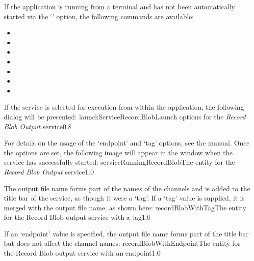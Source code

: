 If the application is running from a terminal and has not been automatically started via
the `' option, the following commands are available:
\begin{itemize}
\item{}
\item\exSp{}
\item\exSp{}
\item\exSp{}
\item\exSp{}
\item\exSp{}
\item\exSp{}
\end{itemize}
\condPage
If the service is selected for execution from within the \emph{\CMU} application, the
following dialog will be presented:
%
{launchServiceRecordBlob}{Launch options for the \emph{Record Blob Output} service}{0.8}

For details on the usage of the `endpoint' and `tag' options, see the \emph{\CMU} manual.
Once the options are set, the following image will appear in the \emph{\CMU} window when
the service has successfully started:
%
{serviceRunningRecordBlob}{The \emph{\CMU} entity for the \emph{Record Blob Output}
service}{1.0}

The output file name forms part of the names of the channels and is added to the title bar
of the service, as though it were a `tag'.
\condPage{}
If a `tag' value is supplied, it is merged with the output file name, as shown here:
%
{recordBlobWithTag}{The \emph{\CMU} entity for the Record Blob output service with a
tag}{1.0}

If an `endpoint' value is specified, the output file name forms part of the title bar but
does not affect the channel names:
%
{recordBlobWithEndpoint}{The \emph{\CMU} entity for the Record Blob output service with an
endpoint}{1.0}

